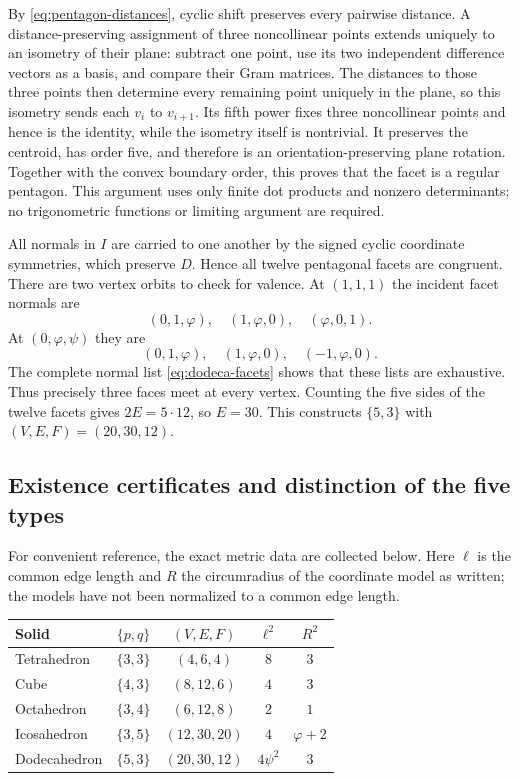 By \eqref{eq:pentagon-distances}, cyclic shift preserves every pairwise
distance.  A distance-preserving assignment of three noncollinear
points extends uniquely to an isometry of their plane: subtract one
point, use its two independent difference vectors as a basis, and
compare their Gram matrices.  The distances to those three points then
determine every remaining point uniquely in the plane, so this isometry
sends each $v_i$ to $v_{i+1}$.
Its fifth power fixes three noncollinear points and hence is the
identity, while the isometry itself is nontrivial.
It preserves the centroid, has order five, and therefore is an
orientation-preserving plane rotation.  Together with the convex
boundary order, this proves that the facet is a regular pentagon.
This argument uses only finite dot products and nonzero determinants;
no trigonometric functions or limiting argument are required.

All normals in $I$ are carried to one another by the signed cyclic
coordinate symmetries, which preserve $D$.  Hence all twelve
pentagonal facets are congruent.
There are two vertex orbits to check for valence.  At $(1,1,1)$ the
incident facet normals are
\[
 (0,1,\varphi),\quad(1,\varphi,0),\quad(\varphi,0,1).
\]
At $(0,\varphi,\psi)$ they are
\[
 (0,1,\varphi),\quad(1,\varphi,0),\quad(-1,\varphi,0).
\]
The complete normal list \eqref{eq:dodeca-facets} shows that these
lists are exhaustive.  Thus precisely three faces meet at every
vertex.  Counting the five sides of the twelve facets gives
$2E=5\cdot12$, so $E=30$.
This constructs $\{5,3\}$ with $(V,E,F)=(20,30,12)$.

\subsection{Existence certificates and distinction of the five types}

For convenient reference, the exact metric data are collected below.
Here $\ell$ is the common edge length and $R$ the circumradius of the
coordinate model as written; the models have not been normalized to a
common edge length.
\begin{center}
\begin{tabular}{lcccc}
\hline
Solid & $\{p,q\}$ & $(V,E,F)$ & $\ell^2$ & $R^2$\\
\hline
Tetrahedron  & $\{3,3\}$ & $(4,6,4)$   & $8$ & $3$\\
Cube         & $\{4,3\}$ & $(8,12,6)$  & $4$ & $3$\\
Octahedron   & $\{3,4\}$ & $(6,12,8)$  & $2$ & $1$\\
Icosahedron  & $\{3,5\}$ & $(12,30,20)$ & $4$ & $\varphi+2$\\
Dodecahedron & $\{5,3\}$ & $(20,30,12)$ & $4\psi^2$ & $3$\\
\hline
\end{tabular}
\end{center}

